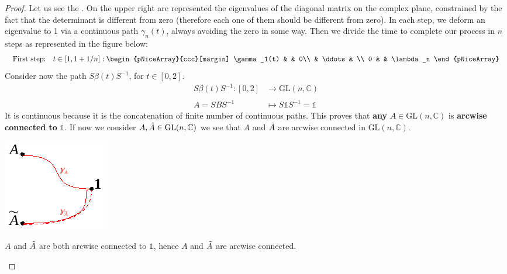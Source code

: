 \documentclass[../main.tex]{subfiles}
\begin{document}
\begin{proof}
\noindent Let us see the .  On the upper right are represented the eigenvalues of the diagonal matrix on the complex plane, constrained by the fact that the determinant is different from zero (therefore each one of them should be different from zero). In each step, we deform an eigenvalue to 1 via a continuous path $\gamma_n(t)$, always avoiding the zero in some way. Then we divide the time to complete our process in $n$ steps as represented in the figure below:
\[
\textrm{First step:} \quad t\in[1,1+1/n]: 
\begin{pNiceArray}{ccc}[margin]
\gamma_1(t) & & 0\\ 
 & \ddots & \\
 0 & & \lambda_n 
\end{pNiceArray}
\]
Consider now the path $S\beta(t)S^{-1}$, for $t\in[0,2]$.
\begin{align*}
S\beta(t)S^{-1}:[0,2]&\xrightarrow[]{}\text{GL}(n,\mathbb{C})\\
A=SBS^{-1}&\mapsto S\mathbb{1}S^{-1}=\mathbb{1}
\end{align*}
It is continuous because it is the concatenation of finite number of continuous paths. This proves that \textbf{any} {\color{red}$A\in \text{GL}(n,\mathbb{C})$} is \textbf{arcwise connected to} $\mathbb{1}$. If now we consider $A,\Tilde{A}\in \text{GL}(n,\mathbb{C})$ we see that $A$ and $\Tilde{A}$ are arcwise connected in $\text{GL}(n,\mathbb{C})$.
\begin{marginfigure}[-50mm]
	\includegraphics[width=1\linewidth]{images/connected.pdf}
	\caption{$A$ and $\Tilde{A}$ are both arcwise connected to $\mathbb{1}$, hence $A$ and $\Tilde{A}$ are arcwise connected.}
\end{marginfigure}
\end{proof}
\end{document}
